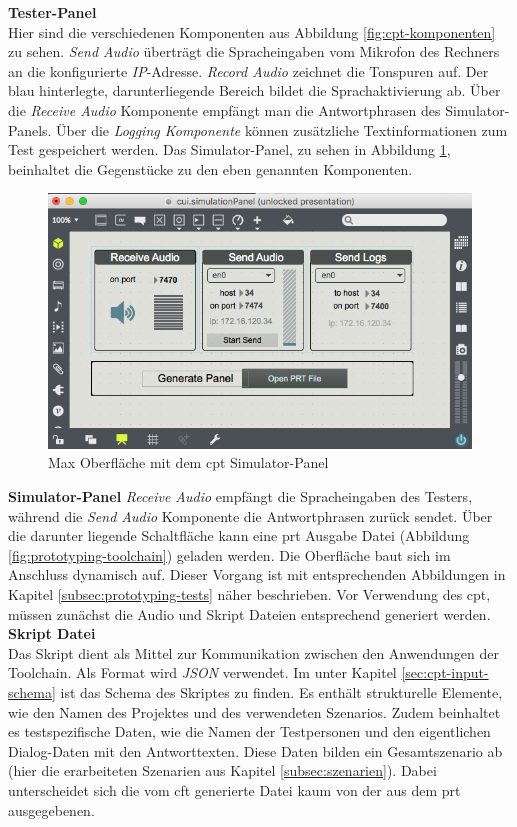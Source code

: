 \textbf{Tester-Panel}\\
Hier sind die verschiedenen Komponenten aus Abbildung \ref{fig:cpt-komponenten} zu sehen. \textit{Send Audio} überträgt die Spracheingaben vom Mikrofon des Rechners an die konfigurierte \textit{\ac{IP}}-Adresse. \textit{Record Audio} zeichnet die Tonspuren auf. Der blau hinterlegte, darunterliegende Bereich bildet die Sprachaktivierung ab. Über die \textit{Receive Audio} Komponente empfängt man die Antwortphrasen des Simulator-Panels. Über die \textit{Logging Komponente} können zusätzliche Textinformationen zum Test gespeichert werden. Das Simulator-Panel, zu sehen in Abbildung \ref{fig:cpt-simulator-panel}, beinhaltet die Gegenstücke zu den eben genannten Komponenten. 

\begin{figure}[!htb]
    \centering
    \includegraphics[width=1.0\textwidth]{bilder/3_cptSimulator.png}
    \caption{Max Oberfläche mit dem cpt Simulator-Panel}
    \label{fig:cpt-simulator-panel}
\end{figure}

\textbf{Simulator-Panel}
\textit{Receive Audio} empfängt die Spracheingaben des Testers, während die \textit{Send Audio} Komponente die Antwortphrasen zurück sendet. Über die darunter liegende Schaltfläche kann eine \ac{prt} Ausgabe Datei (\vgl Abbildung \ref{fig:prototyping-toolchain}) geladen werden. Die Oberfläche baut sich im Anschluss dynamisch auf. Dieser Vorgang ist mit entsprechenden Abbildungen in Kapitel \ref{subsec:prototyping-tests} näher beschrieben. Vor Verwendung des \ac{cpt}, müssen zunächst die Audio und Skript Dateien entsprechend generiert werden.\\

\textbf{Skript Datei}\\
Das Skript dient als Mittel zur Kommunikation zwischen den Anwendungen der Toolchain. Als Format wird \textit{\ac{JSON}} verwendet. Im  unter Kapitel \ref{sec:cpt-input-schema} ist das Schema des Skriptes zu finden. Es enthält strukturelle Elemente, wie den Namen des Projektes und des verwendeten Szenarios. Zudem beinhaltet es testspezifische Daten, wie die Namen der Testpersonen und den eigentlichen Dialog-Daten mit den Antworttexten. Diese Daten bilden ein Gesamtszenario ab (hier die erarbeiteten Szenarien aus Kapitel \ref{subsec:szenarien}). Dabei unterscheidet sich die vom \ac{cft} generierte Datei kaum von der aus dem \ac{prt} ausgegebenen. 

